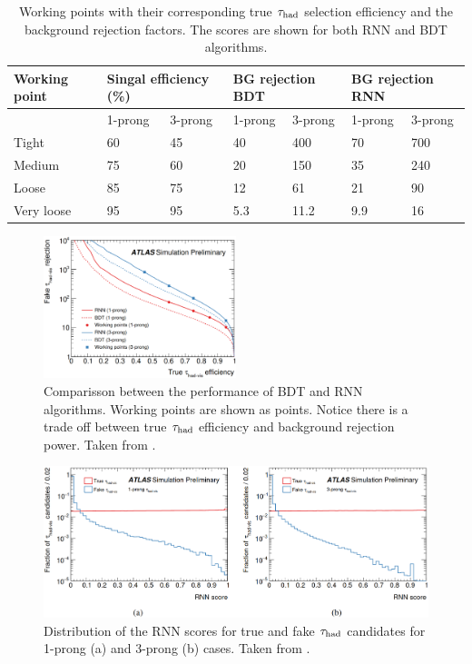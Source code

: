 \begin{table}[]
	\centering
	\begin{tabular}{|l|l|l|l|l|l|l|}
		\hline
		Working point & \multicolumn{2}{l|}{Singal efficiency (\%)} & \multicolumn{2}{l|}{BG rejection BDT} & \multicolumn{2}{l|}{BG rejection RNN} \\ \hline
		& 1-prong              & 3-prong              & 1-prong               & 3-prong               & 1-prong               & 3-prong               \\ \hline
		Tight         & 60                   & 45                   & 40                    & 400                   & 70                    & 700                   \\ \hline
		Medium        & 75                   & 60                   & 20                    & 150                   & 35                    & 240                   \\ \hline
		Loose         & 85                   & 75                   & 12                    & 61                    & 21                    & 90                    \\ \hline
		Very loose    & 95                   & 95                   & 5.3                   & 11.2                  & 9.9                   & 16                    \\ \hline
	\end{tabular}
	\caption{Working points with their corresponding true $\tau_\text{had}$ selection efficiency and the background rejection factors. The scores are shown for both RNN and BDT algorithms.}
	\label{Table2}
\end{table}
\begin{figure}[h]
	\centering
	\includegraphics[width=0.5\textwidth]{figures/Fig5}
	\caption{Comparisson between the performance of BDT and RNN algorithms. Working points are shown as points. Notice there is a trade off between true $\tau_\text{had}$ efficiency and background rejection power. Taken from \cite{Deutsch:2680523}.}
	\label{Fig5}
\end{figure}
\begin{figure}[h]
	\centering
	\includegraphics[width=1\textwidth]{figures/Fig6}
	\caption{Distribution of the RNN scores for true and fake $\tau_\text{had}$ candidates for 1-prong (a) and 3-prong (b) cases. Taken from \cite{Deutsch:2680523}.}
	\label{Fig6}
\end{figure}